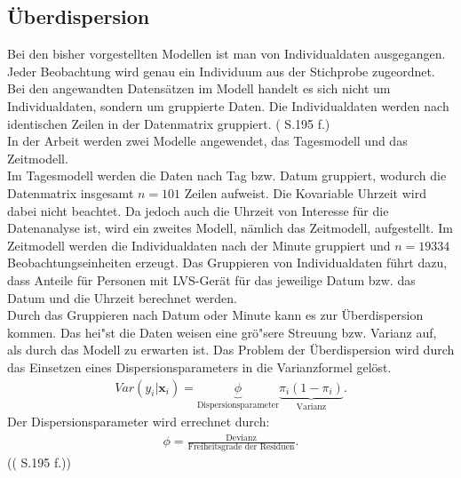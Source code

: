 \documentclass[12pt]{scrreprt}
\begin{document}
\subsection{Überdispersion}
Bei den bisher vorgestellten Modellen ist man von Individualdaten ausgegangen. Jeder Beobachtung wird genau ein Individuum aus der Stichprobe zugeordnet.
Bei den angewandten Datensätzen im Modell handelt es sich nicht um Individualdaten, sondern um gruppierte Daten. Die Individualdaten werden nach identischen Zeilen in der Datenmatrix gruppiert. (\cite{fahrmeir2007regression} S.195 f.) \\ 
In der Arbeit werden zwei Modelle angewendet, das Tagesmodell und das Zeitmodell. \\
Im Tagesmodell werden die Daten nach Tag bzw. Datum gruppiert, wodurch die Datenmatrix insgesamt $n = 101$ Zeilen aufweist. Die Kovariable Uhrzeit wird dabei nicht beachtet. Da jedoch auch die Uhrzeit von Interesse für die Datenanalyse ist, wird ein zweites Modell, nämlich das Zeitmodell, aufgestellt. Im Zeitmodell werden die Individualdaten nach der Minute gruppiert und $n = 19334$ Beobachtungseinheiten erzeugt. Das Gruppieren von Individualdaten führt dazu, dass Anteile für Personen mit LVS-Gerät für das jeweilige Datum bzw. das Datum und die Uhrzeit berechnet werden. \\
Durch das Gruppieren nach Datum oder Minute kann es zur Überdispersion kommen. Das hei"st die Daten weisen eine grö"sere Streuung bzw. Varianz auf, als durch das Modell zu erwarten ist. Das Problem der Überdispersion wird durch das Einsetzen eines Dispersionsparameters in die Varianzformel gelöst.
\begin{align}
Var(y_{i}|\textbf{x}_{i})=\underbrace{\phi}_\text{Dispersionsparameter} \underbrace{\pi_{i}(1-\pi_{i})}_\text{Varianz}.
\end{align}
Der Dispersionsparameter wird errechnet durch:
\begin{align}
\phi=\frac{\text{Devianz}}{\text{Freiheitsgrade der Residuen}}.
\end{align} 
({(\cite{fahrmeir2007regression} S.195 f.)})
\end{document}
